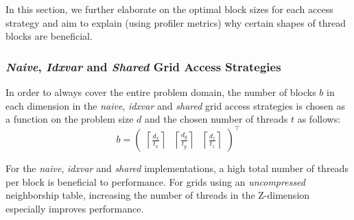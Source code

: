 In this section, we further elaborate on the optimal block sizes for each access strategy and aim to explain (using profiler metrics) why certain shapes of thread blocks are beneficial.

\subsubsection{\emph{Naive}, \emph{Idxvar} and \emph{Shared} Grid Access Strategies}

In order to always cover the entire problem domain, the number of blocks $b$ in each dimension in the \emph{naive}, \emph{idxvar} and \emph{shared} grid access strategies is chosen as a function on the problem size $d$ and the chosen number of threads $t$ as follows:
$$b = \begin{pmatrix}\left\lceil\frac{d_x}{t_x}\right\rceil & \left\lceil\frac{d_y}{t_y}\right\rceil & \left\lceil\frac{d_z}{t_z}\right\rceil\end{pmatrix}^\top$$

For the \emph{naive}, \emph{idxvar} and \emph{shared} implementations, a high total number of threads per block is beneficial to performance. For grids using an \emph{uncompressed} neighborship table, increasing the number of threads in the Z-dimension especially improves performance.

